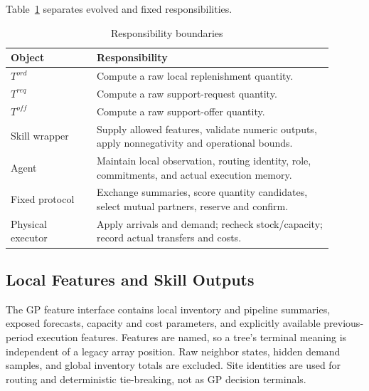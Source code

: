 Table~\ref{tab:boundaries} separates evolved and fixed responsibilities.
\begin{table}[t]
\centering
\caption{Responsibility boundaries}
\label{tab:boundaries}
\footnotesize
\begin{tabular}{p{0.24\linewidth}p{0.66\linewidth}}
\toprule
Object & Responsibility \\
\midrule
$T^{ord}$ & Compute a raw local replenishment quantity. \\
$T^{req}$ & Compute a raw support-request quantity. \\
$T^{off}$ & Compute a raw support-offer quantity. \\
Skill wrapper & Supply allowed features, validate numeric outputs, apply
nonnegativity and operational bounds. \\
Agent & Maintain local observation, routing identity, role, commitments,
and actual execution memory. \\
Fixed protocol & Exchange summaries, score quantity candidates, select
mutual partners, reserve and confirm. \\
Physical executor & Apply arrivals and demand; recheck stock/capacity;
record actual transfers and costs. \\
\bottomrule
\end{tabular}
\end{table}

\subsection{Local Features and Skill Outputs}
The GP feature interface contains local inventory and pipeline summaries,
exposed forecasts, capacity and cost parameters, and explicitly available
previous-period execution features. Features are named, so a tree's
terminal meaning is independent of a legacy array position. Raw neighbor
states, hidden demand samples, and global inventory totals are excluded.
Site identities are used for routing and deterministic tie-breaking, not as
GP decision terminals.

